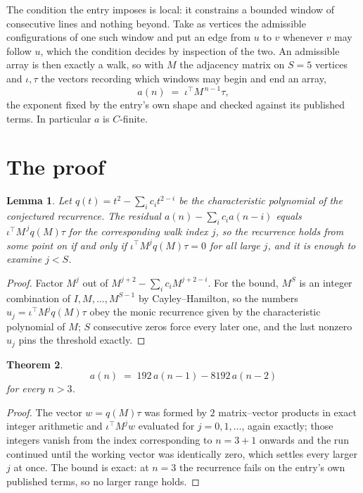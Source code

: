 \documentclass[11pt,a4paper]{article}
\theoremstyle{plain}
\newtheorem{theorem}{Theorem}
\newtheorem{lemma}[theorem]{Lemma}
\theoremstyle{definition}
\begin{document}
The condition the entry imposes is local: it constrains a bounded window of consecutive lines and nothing beyond. Take as
vertices the admissible configurations of one such window and put an edge from $u$ to $v$
whenever $v$ may follow $u$, which the condition decides by inspection of the two. An
admissible array is then exactly a walk, so with $M$ the adjacency matrix on $S=5$ vertices
and $\iota,\tau$ the vectors recording which windows may begin and end an array,
\[
a(n)\;=\;\iota^{\!\top}M^{\,n-1}\tau ,
\]
the exponent fixed by the entry's own shape and checked against its published terms. In
particular $a$ is $C$-finite.

\section{The proof}

\begin{lemma}\label{lem:crit}
Let $q(t)=t^{2}-\sum_i c_it^{2-i}$ be the characteristic polynomial of the
conjectured recurrence. The residual $a(n)-\sum_ic_ia(n-i)$ equals
$\iota^{\!\top}M^{\,j}q(M)\tau$ for the corresponding walk index $j$, so the recurrence
holds from some point on if and only if $\iota^{\!\top}M^{j}q(M)\tau=0$ for all large $j$,
and it is enough to examine $j<S$.
\end{lemma}

\begin{proof}
Factor $M^{j}$ out of $M^{j+2}-\sum_ic_iM^{j+2-i}$. For the bound, $M^{S}$
is an integer combination of $I,M,\dots,M^{S-1}$ by Cayley--Hamilton, so the numbers
$u_j=\iota^{\!\top}M^{j}q(M)\tau$ obey the monic recurrence given by the characteristic
polynomial of $M$; $S$ consecutive zeros force every later one, and the last nonzero $u_j$
pins the threshold exactly.
\end{proof}

\begin{theorem}
\[
a(n)\;=\;192\,a(n-1) - 8192\,a(n-2)
\]
for every $n>3$.
\end{theorem}

\begin{proof}
The vector $w=q(M)\tau$ was formed by $2$ matrix--vector products in exact integer
arithmetic and $\iota^{\!\top}M^{j}w$ evaluated for $j=0,1,\dots$, again exactly; those
integers vanish from the index corresponding to $n=3+1$ onwards and the run continued
until the working vector was identically zero, which settles every larger $j$ at once. The bound is exact: at $n=3$ the recurrence fails on the entry's own published terms, so no larger range holds.
\end{proof}
\end{document}
